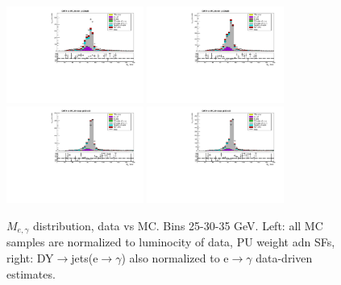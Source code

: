 \begin{figure}[htb]
\begin{center}
    \includegraphics[width=0.40\textwidth]{../figs/figs_v11/ELECTRON_WGamma/PrepareYields/c_TotalDATAvsMC_Barrel__Mpholep1PRELIMINARY_FOR_E_TO_GAMMA_WITH_PSV_CUT_pt30to35_.pdf} \includegraphics[width=0.40\textwidth]{../figs/figs_v11/ELECTRON_WGamma/PrepareYields/c_TotalDATAvsMC_Barrel__Mpholep1PRELIMINARY_FOR_E_TO_GAMMA_WITH_PSV_CUT_pt30to35__etogScale.pdf}   \\
    \includegraphics[width=0.40\textwidth]{../figs/figs_v11/ELECTRON_WGamma/PrepareYields/c_TotalDATAvsMC_Endcap__Mpholep1PRELIMINARY_FOR_E_TO_GAMMA_WITH_PSV_CUT_pt30to35_.pdf} \includegraphics[width=0.40\textwidth]{../figs/figs_v11/ELECTRON_WGamma/PrepareYields/c_TotalDATAvsMC_Endcap__Mpholep1PRELIMINARY_FOR_E_TO_GAMMA_WITH_PSV_CUT_pt30to35__etogScale.pdf}\\
   \label{fig:Mpholep1DatavsMC_25to35}
  \caption{$M_{e,\gamma}$ distribution, data vs MC. Bins 25-30-35 GeV. Left: all MC samples are normalized to luminocity of data, PU weight adn SFs, right: DY$\rightarrow$jets(e$\rightarrow\gamma$) also normalized to e$\rightarrow\gamma$ data-driven estimates.}
  \end{center}
\end{figure}

